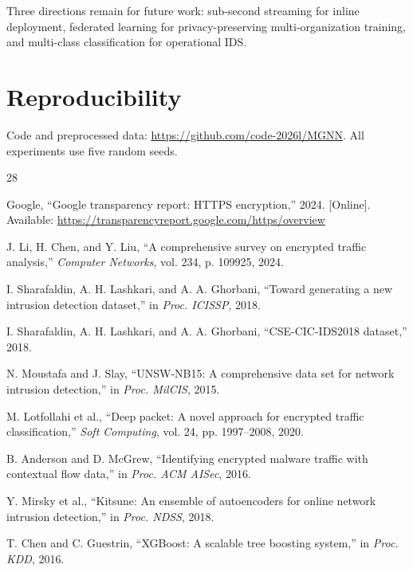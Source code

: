 \documentclass[conference]{IEEEtran}
\begin{document}
Three directions remain for future work: sub-second streaming for inline deployment, federated learning for privacy-preserving multi-organization training, and multi-class classification for operational IDS.

\section*{Reproducibility}
Code and preprocessed data: \url{https://github.com/code-2026l/MGNN}. All experiments use five random seeds.



\begin{thebibliography}{28}

Google, ``Google transparency report: HTTPS encryption,'' 2024. [Online]. Available: \url{https://transparencyreport.google.com/https/overview}

J. Li, H. Chen, and Y. Liu, ``A comprehensive survey on encrypted traffic analysis,'' \emph{Computer Networks}, vol. 234, p. 109925, 2024.

I. Sharafaldin, A. H. Lashkari, and A. A. Ghorbani, ``Toward generating a new intrusion detection dataset,'' in \emph{Proc. ICISSP}, 2018.

I. Sharafaldin, A. H. Lashkari, and A. A. Ghorbani, ``CSE-CIC-IDS2018 dataset,'' 2018.

N. Moustafa and J. Slay, ``UNSW-NB15: A comprehensive data set for network intrusion detection,'' in \emph{Proc. MilCIS}, 2015.

M. Lotfollahi et al., ``Deep packet: A novel approach for encrypted traffic classification,'' \emph{Soft Computing}, vol. 24, pp. 1997--2008, 2020.

B. Anderson and D. McGrew, ``Identifying encrypted malware traffic with contextual flow data,'' in \emph{Proc. ACM AISec}, 2016.

Y. Mirsky et al., ``Kitsune: An ensemble of autoencoders for online network intrusion detection,'' in \emph{Proc. NDSS}, 2018.

T. Chen and C. Guestrin, ``XGBoost: A scalable tree boosting system,'' in \emph{Proc. KDD}, 2016.


\end{thebibliography}
\end{document}
